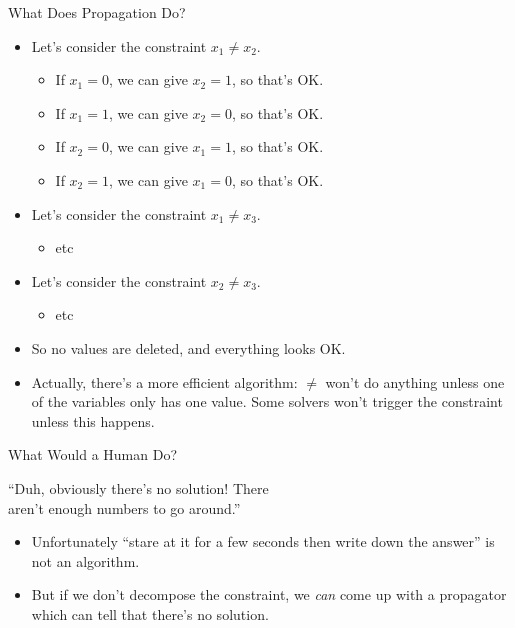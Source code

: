 \documentclass{beamer}
\begin{document}
\begin{frame}{What Does Propagation Do?}

    \begin{itemize}
        \item Let's consider the constraint $x_1 \ne x_2$.
            \begin{itemize}
                \item If $x_1 = 0$, we can give $x_2 = 1$, so that's OK.
                \item If $x_1 = 1$, we can give $x_2 = 0$, so that's OK.
                \item If $x_2 = 0$, we can give $x_1 = 1$, so that's OK.
                \item If $x_2 = 1$, we can give $x_1 = 0$, so that's OK.
            \end{itemize}
        \item Let's consider the constraint $x_1 \ne x_3$.
            \begin{itemize}
                \item etc
            \end{itemize}
        \item Let's consider the constraint $x_2 \ne x_3$.
            \begin{itemize}
                \item etc
            \end{itemize}
        \item So no values are deleted, and everything looks OK.
        \item Actually, there's a more efficient algorithm: $\ne$ won't do anything unless one of
            the variables only has one value. Some solvers won't trigger the constraint unless this
            happens.
    \end{itemize}

\end{frame}

\begin{frame}{What Would a Human Do?}
    \begin{center}
        ``Duh, obviously there's no solution! There \\ aren't enough numbers to go around.''
    \end{center}

    \begin{itemize}
        \item Unfortunately ``stare at it for a few seconds then write down the answer'' is not an algorithm.

        \item But if we don't decompose the constraint, we \emph{can} come up with a propagator
            which can tell that there's no solution.
    \end{itemize}
\end{frame}
\end{document}
